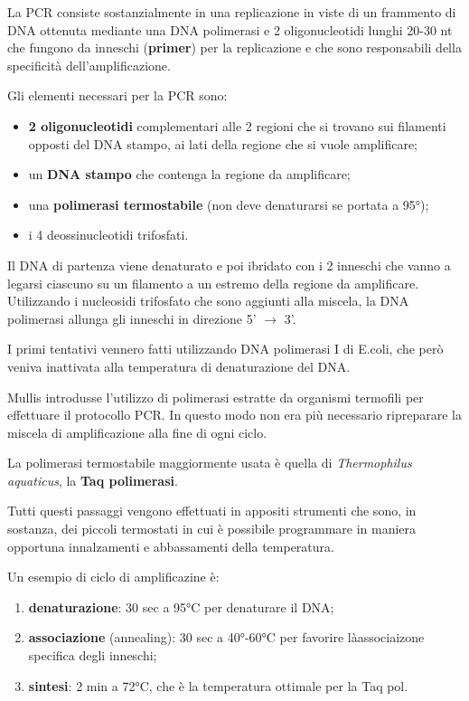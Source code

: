 \documentclass[11pt]{book}
\begin{document}
La PCR consiste sostanzialmente in una replicazione in viste di un
frammento di DNA ottenuta mediante una DNA polimerasi e 2
oligonucleotidi lunghi 20-30 nt che fungono da inneschi
(\textbf{primer}) per la replicazione e che sono responsabili della
specificità dell'amplificazione.

Gli elementi necessari per la PCR sono:

\begin{itemize}
\itemsep1pt\parskip0pt
\item
  \textbf{2 oligonucleotidi} complementari alle 2 regioni che si trovano
  sui filamenti opposti del DNA stampo, ai lati della regione che si
  vuole amplificare;
\item
  un \textbf{DNA stampo} che contenga la regione da amplificare;
\item
  una \textbf{polimerasi termostabile} (non deve denaturarsi se portata
  a 95°);
\item
  i 4 deossinucleotidi trifosfati.
\end{itemize}

Il DNA di partenza viene denaturato e poi ibridato con i 2 inneschi che
vanno a legarsi ciascuno su un filamento a un estremo della regione da
amplificare. Utilizzando i nucleosidi trifosfato che sono aggiunti alla
miscela, la DNA polimerasi allunga gli inneschi in direzione 5'
\(\rightarrow\) 3'.

I primi tentativi vennero fatti utilizzando DNA polimerasi I di E.coli,
che però veniva inattivata alla temperatura di denaturazione del DNA.

Mullis introdusse l'utilizzo di polimerasi estratte da organismi
termofili per effettuare il protocollo PCR. In questo modo non era più
necessario ripreparare la miscela di amplificazione alla fine di ogni
ciclo.

La polimerasi termostabile maggiormente usata è quella di
\emph{Thermophilus aquaticus}, la \textbf{Taq polimerasi}.

Tutti questi passaggi vengono effettuati in appositi strumenti che sono,
in sostanza, dei piccoli termostati in cui è possibile programmare in
maniera opportuna innalzamenti e abbassamenti della temperatura.

Un esempio di ciclo di amplificazine è:

\begin{enumerate}
\def\labelenumi{\arabic{enumi}.}
\itemsep1pt\parskip0pt
\item
  \textbf{denaturazione}: 30 sec a 95°C per denaturare il DNA;
\item
  \textbf{associazione} (annealing): 30 sec a 40°-60°C per favorire
  làassociaizone specifica degli inneschi;
\item
  \textbf{sintesi}: 2 min a 72°C, che è la temperatura ottimale per la
  Taq pol.
\end{enumerate}
\end{document}
